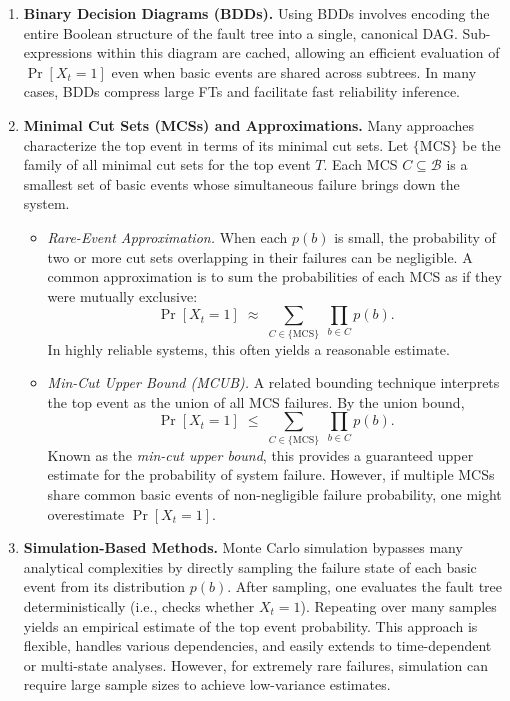 \begin{enumerate}

  \item \textbf{Binary Decision Diagrams (BDDs).}  
  Using BDDs involves encoding the entire Boolean structure of the fault tree into a single, canonical DAG.  Sub-expressions within this diagram are cached, allowing an efficient evaluation of \(\Pr[X_t=1]\) even when basic events are shared across subtrees.  In many cases, BDDs compress large FTs and facilitate fast reliability inference.

  \item \textbf{Minimal Cut Sets (MCSs) and Approximations.}  
  Many approaches characterize the top event in terms of its minimal cut sets.  Let \(\{\mathrm{MCS}\}\) be the family of all minimal cut sets for the top event \(T\).  Each MCS \(C\subseteq \mathcal{B}\) is a smallest set of basic events whose simultaneous failure brings down the system.  

  \begin{itemize}
    \item \emph{Rare-Event Approximation.}  
    When each \(p(b)\) is small, the probability of two or more cut sets overlapping in their failures can be negligible.  A common approximation is to sum the probabilities of each MCS as if they were mutually exclusive:
    \begin{equation}\label{eq:rare_event_approx}
      \Pr[X_t=1]
      \;\approx\;
      \sum_{C\in \{\mathrm{MCS}\}}
      \;\prod_{b \in C} p(b).
    \end{equation}
    In highly reliable systems, this often yields a reasonable estimate.

    \item \emph{Min-Cut Upper Bound (MCUB).}  
    A related bounding technique interprets the top event as the union of all MCS failures. By the union bound,
    \begin{equation}\label{eq:mcub}
      \Pr[X_t=1]
      \;\le\;
      \sum_{C\in \{\mathrm{MCS}\}}
      \;\prod_{b \in C} p(b).
    \end{equation}
    Known as the \emph{min-cut upper bound}, this provides a guaranteed upper estimate for the probability of system failure.  However, if multiple MCSs share common basic events of non-negligible failure probability, one might overestimate \(\Pr[X_t=1]\).  
  \end{itemize}

  \item \textbf{Simulation-Based Methods.}  
  Monte Carlo simulation bypasses many analytical complexities by directly sampling the failure state of each basic event from its distribution \(p(b)\).  After sampling, one evaluates the fault tree deterministically (i.e., checks whether \(X_t=1\)).  Repeating over many samples yields an empirical estimate of the top event probability.  This approach is flexible, handles various dependencies, and easily extends to time-dependent or multi-state analyses.  However, for extremely rare failures, simulation can require large sample sizes to achieve low-variance estimates.

\end{enumerate}


